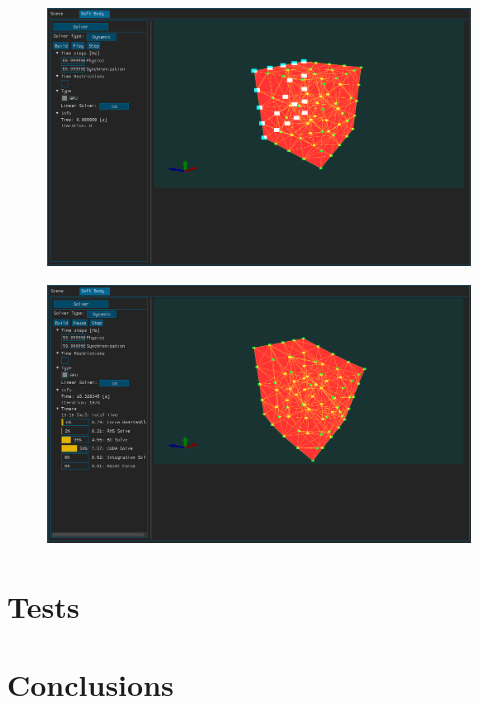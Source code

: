\documentclass[en]{minipw} %
\begin{document}
\begin{figure}[h!]
\centering
\includegraphics[scale=0.5]{pictures/ifx/ifx_solver1.png}
\caption[Logo MiNI]{}
\label{fig:ifx_solver1}
\end{figure}

\begin{figure}[h!]
\centering
\includegraphics[scale=0.5]{pictures/ifx/ifx_solver2.png}
\caption[Logo MiNI]{}
\label{fig:ifx_solver2}
\end{figure}



\chapter{Tests}


\chapter{Conclusions}
\end{document}
